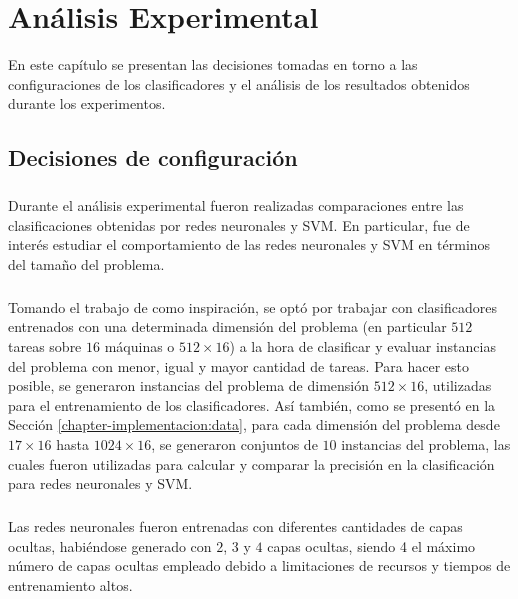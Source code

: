 \chapter{Análisis Experimental} \label{capitulo:analisis-experimental}

En este capítulo se presentan las decisiones tomadas en torno a las configuraciones de los clasificadores y el análisis de los resultados obtenidos durante los experimentos. 

\section{Decisiones de configuración} \label{capitulo:configuracion}

\paragraph{} Durante el análisis experimental fueron realizadas comparaciones entre las clasificaciones obtenidas por redes neuronales y SVM.
En particular, fue de interés estudiar el comportamiento de las redes neuronales y SVM en términos del tamaño del problema.

\paragraph{} Tomando el trabajo de \citet{savant-original} como inspiración, se optó por trabajar con clasificadores entrenados con una determinada dimensión del problema (en particular $512$ tareas sobre $16$ máquinas o $512\times 16$) a la hora de clasificar y evaluar instancias del problema con menor, igual y mayor cantidad de tareas.
Para hacer esto posible, se generaron instancias del problema de dimensión $512\times 16$, utilizadas para el entrenamiento de los clasificadores.
Así también, como se presentó en la Sección \ref{chapter-implementacion:data}, para cada dimensión del problema desde $17\times 16$ hasta $1024\times 16$, se generaron conjuntos de $10$ instancias del problema, las cuales fueron utilizadas para calcular y comparar la precisión en la clasificación para redes neuronales y SVM.

\newpage %

\paragraph{} Las redes neuronales fueron entrenadas con diferentes cantidades de capas ocultas, habiéndose generado con $2$, $3$ y $4$ capas ocultas, siendo 4 el máximo número de capas ocultas empleado debido a limitaciones de recursos y tiempos de entrenamiento altos.

